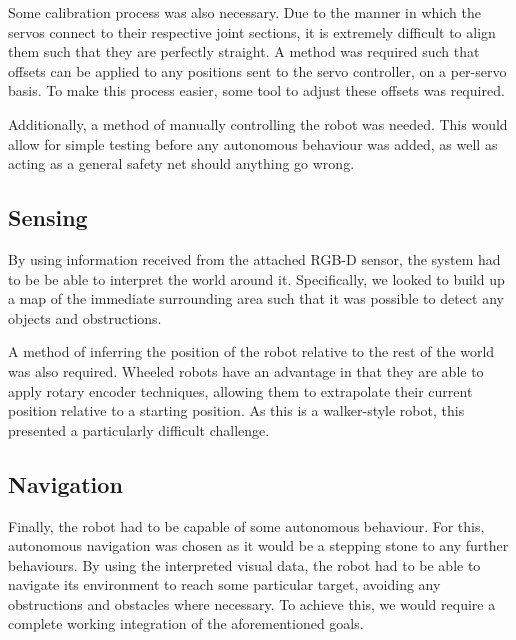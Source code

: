 Some calibration process was also necessary. Due to the manner in which the servos connect to their respective joint sections, it is extremely difficult to align them such that they are perfectly straight. A method was required such that offsets can be applied to any positions sent to the servo controller, on a per-servo basis. To make this process easier, some tool to adjust these offsets was required.

Additionally, a method of manually controlling the robot was needed. This would allow for simple testing before any autonomous behaviour was added, as well as acting as a general safety net should anything go wrong.

\subsection{Sensing}

By using information received from the attached RGB-D sensor, the system had to be be able to interpret the world around it. Specifically, we looked to build up a map of the immediate surrounding area such that it was possible to detect any objects and obstructions.

A method of inferring the position of the robot relative to the rest of the world was also required. Wheeled robots have an advantage in that they are able to apply rotary encoder techniques, allowing them to extrapolate their current position relative to a starting position. As this is a walker-style robot, this presented a particularly difficult challenge.

\subsection{Navigation}

Finally, the robot had to be capable of some autonomous behaviour. For this, autonomous navigation was chosen as it would be a stepping stone to any further behaviours. By using the interpreted visual data, the robot had to be able to navigate its environment to reach some particular target, avoiding any obstructions and obstacles where necessary. To achieve this, we would require a complete working integration of the aforementioned goals.
